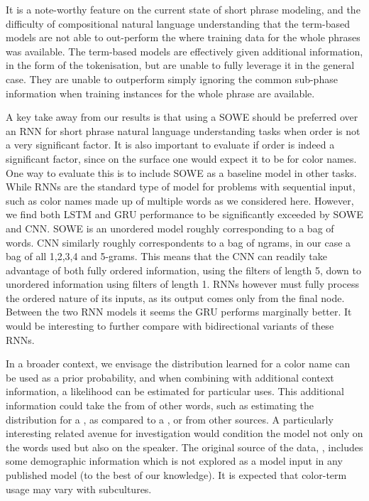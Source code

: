 It is a note-worthy feature on the current state of short phrase modeling,
and the difficulty of compositional natural language understanding
that the term-based models are not able to out-perform the \empmodel{} where training data for the whole phrases was available.
The term-based models are effectively given additional information, in the form of the tokenisation, but are unable to fully leverage it in the general case.
They are unable to outperform simply ignoring the common sub-phase information when training instances for the whole phrase are available.



A key take away from our results is that using a SOWE should be preferred over an RNN for short phrase natural language understanding tasks when order is not a very significant factor.
It is also important to evaluate if order is indeed a significant factor, since on the surface one would expect it to be for color names.
One way to evaluate this is to include SOWE as a baseline model in other tasks.
While RNNs are the standard type of model for problems with sequential input, such as color names made up of multiple words as we considered here.
However, we find both LSTM and GRU performance to be significantly exceeded by SOWE and CNN.
SOWE is an unordered model roughly corresponding to a bag of words.
CNN similarly roughly correspondents to a bag of ngrams, in our case a bag of all 1,2,3,4 and 5-grams.
This means that the CNN can readily take advantage of both fully ordered information, using the filters of length 5, down to unordered information using  filters of length 1.
RNNs however must fully process the ordered nature of its inputs, as its output comes only from the final node.
Between the two RNN models it seems the GRU performs marginally better.
It would be interesting to further compare with bidirectional variants of these RNNs.

In a broader context, we envisage the distribution learned for a color name can be used as a prior probability, and when combining with additional context information, a likelihood can be estimated for particular uses.
This additional information could take the from of other words, such as estimating the distribution for a , as compared to a , or from other sources.
A particularly interesting related avenue for investigation would condition the model not only on the words used but also on the speaker.
The original source of the data, \textcite{Munroe2010XKCDdataset}, includes some demographic information which is not explored as a model input in any  published model (to the best of our knowledge).
It is expected that color-term usage may vary with subcultures.


\clearpage


%